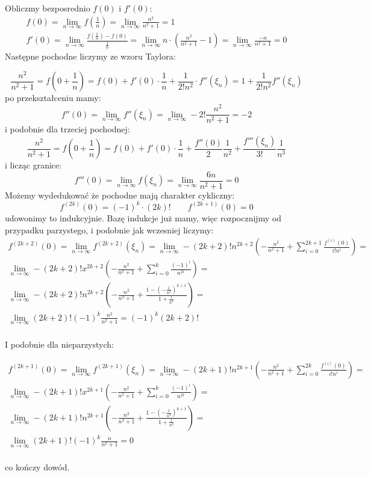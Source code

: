 \documentclass[12pt]{scrartcl}
\begin{document}
    Obliczmy bezposrednio $f(0)$ i $f'(0)$:
    \begin{gather*}
        f(0) = \lim_{n \to \infty } f(\frac{1}{n}) = \lim_{n \to \infty } \frac{n^2}{n^2 + 1} = 1 \\
        f'(0) = \lim_{n \to \infty } \frac{f(\frac{1}{n}) - f(0)}{\frac{1}{n}} = \lim_{n \to \infty } n \cdot  \left ( \frac{n^2}{n^2 + 1} - 1 \right ) = \lim_{n \to \infty } \frac{-n}{n^2 + 1} = 0   
    \end{gather*}
    Następne pochodne liczymy ze wzoru Taylora:

    \[
        \frac{n^2}{n^2 + 1} = f(0 + \frac{1}{n}) = f(0) + f'(0) \cdot \frac{1}{n} + \frac{1}{2!n^2} \cdot f''(\xi_n) = 1 + \frac{1}{2! n^2} f''(\xi_n)
    \]
    po przekształceniu mamy:
    \[
        f''(0) = \lim_{n \to \infty } f''(\xi_n) = \lim_{n \to \infty } - 2! \frac{n^2}{n^2 + 1} = -2  
    \]
    i podobnie dla trzeciej pochodnej:
    \[
      \frac{n^2}{n^2 + 1} = f(0 + \frac{1}{n}) = f(0) + f'(0) \cdot \frac{1}{n} + \frac{f''(0)}{2} \frac{1}{n^2}+ \frac{f'''(\xi_n)}{3!} \frac{1}{n^3}
    \]
    i licząc granice:
    \[
        f'''(0) = \lim_{n \to \infty } f(\xi_n) = \lim_{n \to \infty } \frac{6n}{n^2 + 1} = 0  
    \]
    Możemy wydedukować że pochodne mają charakter cykliczny:
    \[
      f^{(2k)}(0) = (-1)^k \cdot (2k)! \qquad f^{(2k+1)} (0) = 0
    \]
    udowonimy to indukcyjnie. Bazę indukcje już mamy, więc rozpocznijmy od przypadku parzystego, i podobnie jak wczesniej liczymy:
    \begin{gather*}
      f^{(2k + 2)}(0) = \lim_{n \to \infty } f^{(2k + 2)} (\xi_n) = \lim_{n \to \infty } - (2k + 2)! n^{2k+2} \left ( - \frac{n^2}{n^2 + 1} + \sum_{i = 0}^{2k + 1} \frac{f^{(i)}(0)}{i! n^i} \right ) =  \\
    \lim_{n \to \infty } -(2k+2)! x^{2k+2} \left ( - \frac{n^2}{n^2 + 1} + \sum_{i = 0 }^{k} \frac{(-1)^i}{n^{2i}} \right ) = \\
      \lim_{n \to \infty } -(2k+2)! n^{2k+2} \left ( - \frac{n^2}{n^2 + 1} + \frac{1 - \left ( - \frac{1}{n^2} \right )^{k+1}}{1 + \frac{1}{n^2}}  \right ) = \\
      \lim_{n \to \infty } (2k+2)! (-1)^k \frac{n^2}{n^2 + 1} = (-1)^k (2k+2)! \\
    \end{gather*}

    I podobnie dla nieparzystych:

    \begin{gather*}
      f^{(2k + 1)}(0) = \lim_{n \to \infty } f^{(2k + 1)} (\xi_n) = \lim_{n \to \infty } - (2k + 1)! n^{2k+1} \left ( - \frac{n^2}{n^2 + 1} + \sum_{i = 0}^{2k} \frac{f^{(i)}(0)}{i! n^i} \right ) =  \\
    \lim_{n \to \infty } -(2k+1)! x^{2k+1} \left ( - \frac{n^2}{n^2 + 1} + \sum_{i = 0 }^{k} \frac{(-1)^i}{n^{2i}} \right ) = \\
      \lim_{n \to \infty } -(2k+1)! n^{2k+1} \left ( - \frac{n^2}{n^2 + 1} + \frac{1 - \left ( - \frac{1}{n^2} \right )^{k+1}}{1 + \frac{1}{n^2}}  \right ) = \\
      \lim_{n \to \infty } (2k+1)! (-1)^k \frac{n}{n^2 + 1} = 0 \\
    \end{gather*}

    co kończy dowód.
\end{document}
